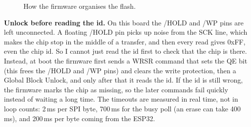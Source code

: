 \documentclass[a4paper,10pt]{article}
\begin{document}
\begin{figure}[H]
\centering
{}
\caption{How the firmware organises the flash.}
\label{fig:nor-map}
\end{figure}

\textbf{Unlock before reading the id.} On this board the /HOLD and /WP
pins are left unconnected. A floating /HOLD pin picks up noise from the SCK line,
which makes the chip stop in the middle of a transfer, and then every read gives
0xFF, even the chip id. So I cannot just read the id first to check that the chip is
there. Instead, at boot the firmware first sends a WRSR command that sets the QE bit (this
frees the /HOLD and /WP pins) and clears the write protection, then a
Global Block Unlock, and only after that it reads the id. If the id is still wrong, the
firmware marks the chip as missing, so the later commands fail quickly instead of waiting a
long time. The timeouts are measured in real time, not in loop counts: 2\,ms per SPI byte,
700\,ms for the busy poll (an erase can take 400\,ms), and 200\,ms per byte coming from the
ESP32.
\end{document}
